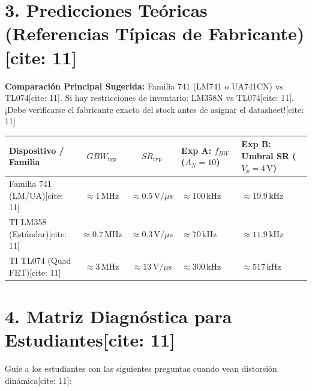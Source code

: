 \documentclass[11pt, a4paper]{article}
\begin{document}
\section*{3. Predicciones Teóricas (Referencias Típicas de Fabricante)[cite: 11]}
\textbf{Comparación Principal Sugerida:} Familia 741 (LM741 o UA741CN) vs TL074[cite: 11]. Si hay restricciones de inventario: LM358N vs TL074[cite: 11]. ¡Debe verificarse el fabricante exacto del stock antes de asignar el datasheet![cite: 11]

\begin{table}[htbp]
    \centering
    \footnotesize
    \renewcommand{\arraystretch}{1.3}
    \begin{tabularx}{\textwidth}{|l|c|c|>{\raggedright\arraybackslash}X|>{\raggedright\arraybackslash}X|}
    \hline
    \textbf{Dispositivo / Familia} & \textbf{$GBW_{\mathrm{typ}}$} & \textbf{$SR_{\mathrm{typ}}$} & \textbf{Exp A: $f_{BW}$ ($A_N=10$)} & \textbf{Exp B: Umbral SR ($V_p=4\,\text{V}$)} \\ \hline
    Familia 741 (LM/UA)[cite: 11] & $\approx 1\,\text{MHz}$ & $\approx 0.5\,\text{V}/\mu\text{s}$ & $\approx 100\,\text{kHz}$ & $\approx 19.9\,\text{kHz}$ \\ \hline
    TI LM358 (Estándar)[cite: 11] & $\approx 0.7\,\text{MHz}$ & $\approx 0.3\,\text{V}/\mu\text{s}$ & $\approx 70\,\text{kHz}$ & $\approx 11.9\,\text{kHz}$ \\ \hline
    TI TL074 (Quad FET)[cite: 11] & $\approx 3\,\text{MHz}$ & $\approx 13\,\text{V}/\mu\text{s}$ & $\approx 300\,\text{kHz}$ & $\approx 517\,\text{kHz}$ \\ \hline
    \end{tabularx}
\end{table}

\section*{4. Matriz Diagnóstica para Estudiantes[cite: 11]}
Guíe a los estudiantes con las siguientes preguntas cuando vean distorsión dinámica[cite: 11]:
\end{document}
